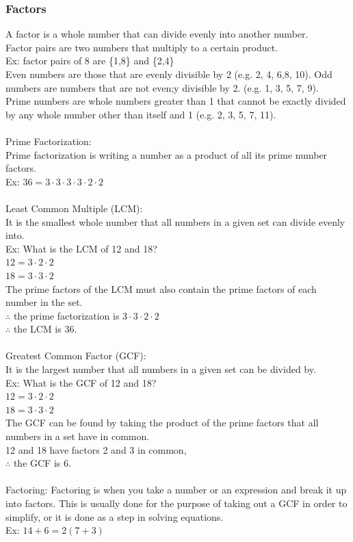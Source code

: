 \documentclass[11pt, fleqn]{article}
\begin{document}
\subsubsection{Factors}
A factor is a whole number that can divide evenly into another number.\\
Factor pairs are two numbers that multiply to a certain product.\\
Ex: factor pairs of 8 are \{1,8\} and \{2,4\}\\
Even numbers are those that are evenly divisible by 2 (e.g. 2, 4, 6,8, 10). Odd numbers are numbers that are not even;y divisible by 2. (e.g. 1, 3, 5, 7, 9).\\
Prime numbers are whole numbers greater than 1 that cannot be exactly divided by any whole number other than itself and 1 (e.g. 2, 3, 5, 7, 11).\\
\\
Prime Factorization:\\
Prime factorization is writing a number as a product of all its prime number factors.\\
Ex: $36=3\cdot 3\cdot 3\cdot 3\cdot 2\cdot 2$\\
\\
Least Common Multiple (LCM):\\
It is the smallest whole number that all numbers in a given set can divide evenly into.\\
Ex: What is the LCM of 12 and 18?\\
$12=3\cdot 2\cdot 2$\\
$18=3\cdot 3\cdot 2$\\
The prime factors of the LCM must also contain the prime factors of each number in the set.\\
$\therefore $ the prime factorization is $3\cdot 3\cdot 2\cdot 2$\\
$\therefore$ the LCM is 36.\\
\\
Greatest Common Factor (GCF):\\
It is the largest number that all numbers in a given set can be divided by.\\
Ex: What is the GCF of 12 and 18?\\
$12=3\cdot 2\cdot 2$\\
$18=3\cdot 3\cdot 2$\\
The GCF can be found by taking the product of the prime factors that all numbers in a set have in common.\\
12 and 18 have factors 2 and 3 in common,\\
$\therefore$ the GCF is 6.\\
\\
Factoring:
Factoring is when you take a number or an expression and break it up into factors. This is usually done for the purpose of taking out a GCF in order to simplify, or it is done as a step in solving equations.\\
Ex: $14+6=2(7+3)$\\
\end{document}
